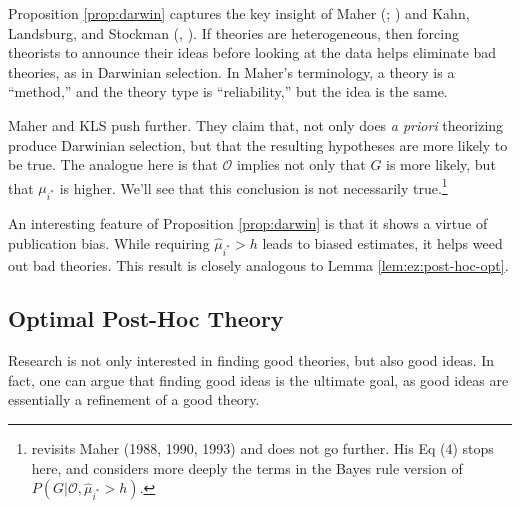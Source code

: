 \documentclass[12pt,english]{article}
\theoremstyle{plain}
\theoremstyle{plain}
\begin{document}
Proposition \ref{prop:darwin} captures the key insight of Maher (\citeyear{maher1988prediction}; \citeyear{maher1990prediction}) and Kahn, Landsburg, and Stockman (\citeyear{kahn1992novel}, \citeyear{kahn1996positive}). If theories are heterogeneous, then forcing theorists to announce their ideas before looking at the data helps eliminate bad theories, as in Darwinian selection.  In Maher's terminology, a theory  is a ``method,'' and the theory type is ``reliability,'' but the idea is the same. 


Maher and KLS push further. They claim that, not only does \emph{a priori} theorizing produce Darwinian selection, but that the resulting hypotheses are more likely to be true. The analogue here is that $\mathcal{O}$ implies not only that $G$ is more likely, but that $\mu_{i^\ast}$ is higher. We'll see that this conclusion is not necessarily true.\footnote{\citet{barnes1996discussion} revisits Maher (1988, 1990, 1993) and does not go further. His Eq (4) stops here, and considers more deeply the terms in the Bayes rule version of $P\left(G|\mathcal{O},\hat{\mu}_{i^{\ast}}>h\right)$. 
} 

An interesting feature of Proposition \ref{prop:darwin} is that it shows a virtue of publication bias. While requiring $\hat{\mu}_{i^{\ast}}>h$ leads to biased estimates, it helps weed out bad theories. This result is closely analogous to Lemma \ref{lem:ez:post-hoc-opt}. 




\subsection{Optimal Post-Hoc Theory}

Research is not only interested in finding good theories, but also good ideas. In fact, one can argue that finding good ideas is the ultimate goal, as good ideas are essentially a refinement of a good theory. 
\end{document}
